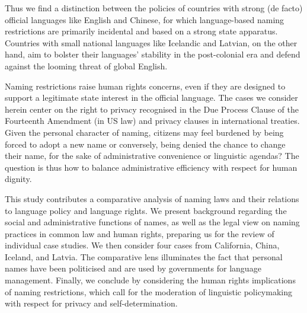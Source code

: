 Thus we find a distinction between the policies of countries with strong (de
facto) official languages like English and Chinese, for which language-based
naming restrictions are primarily incidental and based on a strong state
apparatus. Countries with small national languages like Icelandic and Latvian,
on the other hand, aim to bolster their languages' stability in the
post-colonial era and defend against the looming threat of global English.

Naming restrictions raise human rights concerns, even if they are designed to
support a legitimate state interest in the official language. The cases we
consider herein center on the right to privacy recognised in the Due Process
Clause of the Fourteenth Amendment (in US law) and privacy clauses in
international treaties. Given the personal character of naming, citizens may
feel burdened by being forced to adopt a new name or conversely, being denied
the chance to change their name, for the sake of administrative convenience or
linguistic agendas? The question is thus how to balance administrative efficiency
with respect for human dignity.

This study contributes a comparative analysis of naming laws and their
relations to language policy and language rights. We present background
regarding the social and administrative functions of names, as well as the
legal view on naming practices in common law and human rights, preparing us for
the review of individual case studies. We then consider four cases from
California, China, Iceland, and Latvia. The comparative lens illuminates the
fact that personal names have been politicised and are used by governments for
language management. Finally, we conclude by considering the human rights
implications of naming restrictions, which call for the moderation of
linguistic policymaking with respect for privacy and self-determination.
